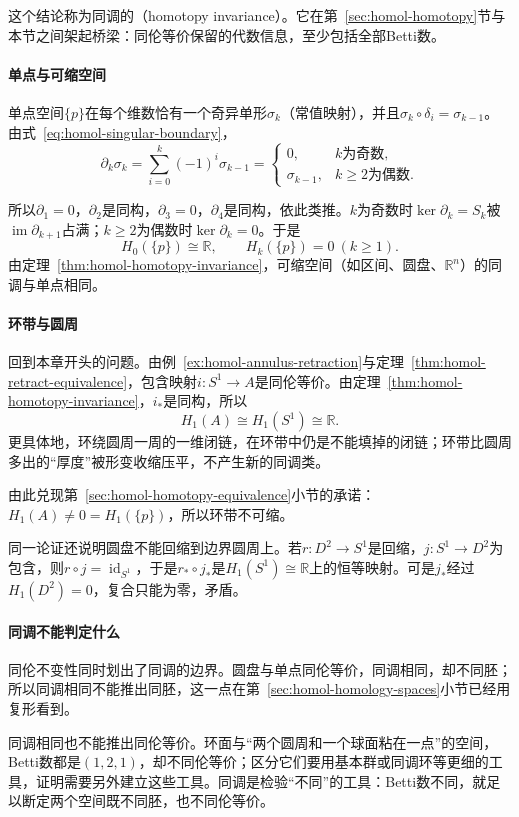 这个结论称为同调的（homotopy invariance）。它在第~\ref{sec:homol-homotopy}节与本节之间架起桥梁：同伦等价保留的代数信息，至少包括全部Betti数。

\paragraph{单点与可缩空间}
单点空间$\{p\}$在每个维数恰有一个奇异单形$\sigma_k$（常值映射），并且$\sigma_k\circ\delta_i=\sigma_{k-1}$。由式~\eqref{eq:homol-singular-boundary}，
\[
 \partial_k\sigma_k=\sum_{i=0}^k(-1)^i\sigma_{k-1}=
 \begin{cases}0,&k\text{为奇数},\\ \sigma_{k-1},&k\geq2\text{为偶数}.\end{cases}
\]

所以$\partial_1=0$，$\partial_2$是同构，$\partial_3=0$，$\partial_4$是同构，依此类推。$k$为奇数时$\ker\partial_k=S_k$被$\operatorname{im}\partial_{k+1}$占满；$k\geq2$为偶数时$\ker\partial_k=0$。于是
\[
 H_0(\{p\})\cong\mathbb R,\qquad H_k(\{p\})=0\ (k\geq1).
\]
由定理~\ref{thm:homol-homotopy-invariance}，可缩空间（如区间、圆盘、$\mathbb R^n$）的同调与单点相同。

\paragraph{环带与圆周}
回到本章开头的问题。由例~\ref{ex:homol-annulus-retraction}与定理~\ref{thm:homol-retract-equivalence}，包含映射$i:S^1\to A$是同伦等价。由定理~\ref{thm:homol-homotopy-invariance}，$i_*$是同构，所以
\[
 H_1(A)\cong H_1(S^1)\cong\mathbb R.
\]
更具体地，环绕圆周一周的一维闭链，在环带中仍是不能填掉的闭链；环带比圆周多出的“厚度”被形变收缩压平，不产生新的同调类。

由此兑现第~\ref{sec:homol-homotopy-equivalence}小节的承诺：$H_1(A)\neq0=H_1(\{p\})$，所以环带不可缩。

同一论证还说明圆盘不能回缩到边界圆周上。若$r:D^2\to S^1$是回缩，$j:S^1\to D^2$为包含，则$r\circ j=\operatorname{id}_{S^1}$，于是$r_*\circ j_*$是$H_1(S^1)\cong\mathbb R$上的恒等映射。可是$j_*$经过$H_1(D^2)=0$，复合只能为零，矛盾。

\paragraph{同调不能判定什么}
同伦不变性同时划出了同调的边界。圆盘与单点同伦等价，同调相同，却不同胚；所以同调相同不能推出同胚，这一点在第~\ref{sec:homol-homology-spaces}小节已经用复形看到。

同调相同也不能推出同伦等价。环面与“两个圆周和一个球面粘在一点”的空间，Betti数都是$(1,2,1)$，却不同伦等价；区分它们要用基本群或同调环等更细的工具，证明需要另外建立这些工具。同调是检验“不同”的工具：Betti数不同，就足以断定两个空间既不同胚，也不同伦等价。
